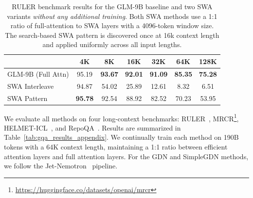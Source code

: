 \begin{table}[h]
    \small
    \centering
    \caption{RULER benchmark results for the GLM-9B baseline and two SWA variants \emph{without any additional training}. Both SWA methods use a 1:1 ratio of full-attention to SWA layers with a 4096-token window size. The search-based SWA pattern is discovered once at 16k context length and applied uniformly across all input lengths.}
    \label{tab:ruler_results}
    \begin{tabular}{lcccccc}
        \toprule
         & {4K} & {8K} & {16K} & {32K} & {64K} & {128K} \\
        \midrule
        GLM-9B (Full Attn)  & 95.19 & \textbf{93.67} & \textbf{92.01} & \textbf{91.09} & \textbf{85.35} & \textbf{75.28} \\
        SWA Interleave      & 94.87 & 54.02 & 25.89 & 12.61 &  8.32 &  6.51 \\
        SWA Pattern & \textbf{95.78} & 92.54 & 88.92 & 82.52 & 70.23 & 53.95 \\
        \bottomrule
    \end{tabular}
\end{table}

We evaluate all methods on four long-context benchmarks: RULER~\cite{hsiehruler}, MRCR\footnote{\url{https://huggingface.co/datasets/openai/mrcr}}, HELMET-ICL~\cite{yen2024helmet}, and RepoQA~\cite{liu2024repoqa}. Results are summarized in Table~\ref{tab:gqa_results_appendix}. We continually train each method on 190B tokens with a 64K context length, maintaining a 1:1 ratio between efficient attention layers and full attention layers. For the GDN and SimpleGDN methods, we follow the Jet-Nemotron~\cite{gu2025jet} pipeline.


